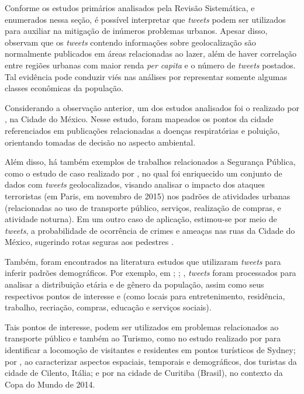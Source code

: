 \documentclass[
	12pt,				%
	oneside,			%
	a4paper,			%
	english,			%
	brazil				%
	]{abntex2ppgsi}
\begin{document}
Conforme os estudos primários analisados pela Revisão Sistemática, e enumerados nessa seção, é possível interpretar que \textit{tweets} podem ser utilizados para auxiliar na mitigação de inúmeros problemas urbanos. Apesar disso, \cite{Chaniotakis2015} observam que os \textit{tweets} contendo informações sobre geolocalização são normalmente publicados em áreas relacionadas ao lazer, além de haver correlação entre regiões urbanas com maior renda \textit{per capita} e o número de \textit{tweets} postados. Tal evidência pode conduzir viés nas análises por representar somente algumas classes econômicas da população. 

Considerando a observação anterior, um dos estudos analisados foi o realizado por \cite{Zagal2016}, na Cidade do México. Nesse estudo, foram mapeados os pontos da cidade referenciados em publicações relacionadas a doenças respiratórias e poluição, orientando tomadas de decisão no aspecto ambiental. 

Além disso, há também exemplos de trabalhos relacionados a Segurança Pública, como o estudo de caso realizado por \cite{Wen2016}, no qual foi enriquecido um conjunto de dados com \textit{tweets} geolocalizados, visando analisar o impacto dos ataques terroristas (em Paris, em novembro de 2015) nos padrões de atividades urbanas (relacionadas ao uso de transporte público, serviços, realização de compras, e atividade noturna). Em um outro caso de aplicação, estimou-se por meio de \textit{tweets}, a probabilidade de ocorrência de crimes e ameaças nas ruas da Cidade do México, sugerindo rotas seguras aos pedestres \cite{Mata2015}.

Também, foram encontrados na literatura estudos que utilizaram \textit{tweets} para inferir padrões demográficos. Por exemplo, em \cite{Farseev2015}; \cite{Gkiotsalitis2015}; \cite{Gkiotsalitis2016}, \textit{tweets} foram processados para analisar a distribuição etária e de gênero da população, assim como seus respectivos pontos de interesse \cite{Hasan2014} e \cite{Maghrebi2015} (como locais para entretenimento, residência, trabalho, recriação, compras, educação e serviços sociais). 

Tais pontos de interesse, podem ser utilizados em problemas relacionados ao transporte público \cite{Gutev2016} e também ao Turismo, como no estudo realizado por \cite{Abbasi2015} para identificar a locomoção de visitantes e residentes em pontos turísticos de Sydney; por \cite{Chua2016}, ao caracterizar aspectos espaciais, temporais e demográficos, dos turistas da cidade de Cilento, Itália; e por \cite{Thomaz2016} na cidade de Curitiba (Brasil), no contexto da Copa do Mundo de 2014.
\end{document}
